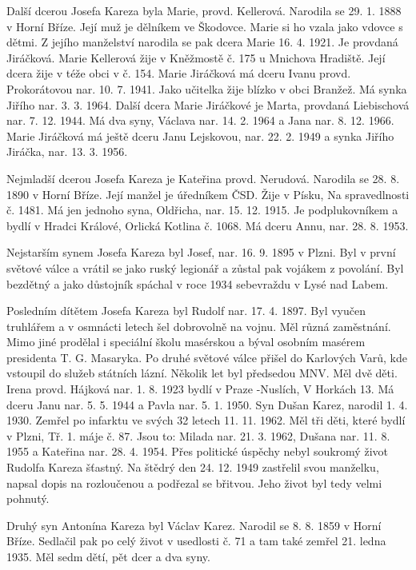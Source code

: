 \documentclass[../dejiny-rodu-prusiku.tex]{subfiles}
\begin{document}
Další dcerou Josefa Kareza byla Marie, provd. Kellerová. Narodila se 29. 1. 1888 v Horní Bříze. Její muž je dělní­kem ve Škodovce. Marie si ho vzala jako vdovce s dětmi. Z jejího manželství narodila se pak dcera Marie 16. 4. 1921. Je provdaná Jiráčková. Marie Kellerová žije v Kněžmostě č. 175 u Mnichova Hradiště. Její dcera žije v téže obci v č. 154. Marie Jiráčková má dceru Ivanu provd. Prokorátovou nar. 10. 7. 1941. Jako učitelka žije blízko v obci Branžež. Má synka Jiřího nar. 3. 3. 1964. Další dcera Marie Jiráčkové je Marta, provdaná Liebischová nar. 7. 12. 1944. Má dva syny, Václava nar. 14. 2. 1964 a Jana nar. 8. 12. 1966. Marie Jiráčková má ještě dceru Janu Lejskovou, nar. 22. 2. 1949 a synka Jiřího Jiráčka, nar. 13. 3. 1956.

Nejmladší dcerou Josefa Kareza je Kateřina provd. Nerudová. Narodila se 28. 8. 1890 v Horní Bříze. Její manžel je úředníkem ČSD. Žije v Písku, Na spravedlnosti č. 1481. Má jen jednoho syna, Oldřicha, nar. 15. 12. 1915. Je podplukovníkem a bydlí v Hradci Králové, Orlická Kotlina č. 1068. Má dceru Annu, nar. 28. 8. 1953.

Nejstarším synem Josefa Kareza byl Josef, nar. 16. 9. 1895 v Plzni. Byl v první světové válce a vrátil se jako ruský legionář a zůstal pak vojákem z povolání. Byl bez­dětný a jako důstojník spáchal v roce 1934 sebevraždu v Lysé nad Labem.

Posledním dítětem Josefa Kareza byl Rudolf nar. 17. 4. 1897. Byl vyučen truhlářem a v osmnácti letech šel dobrovolně na vojnu. Měl různá zaměstnání. Mimo jiné prodělal i spe­ciální školu masérskou a býval osobním masérem presiden­ta T. G. Masaryka. Po druhé světové válce přišel do Karlo­vých Varů, kde vstoupil do služeb státních lázní. Něko­lik let byl předsedou MNV. Měl dvě děti. Irena provd. Háj­ková nar. 1. 8. 1923 bydlí v Praze -Nuslích, V Horkách 13. Má dceru Janu nar. 5. 5. 1944 a Pavla nar. 5. 1. 1950. Syn Dušan Karez, narodil 1. 4. 1930. Zemřel po infarktu ve svých 32 letech 11. 11. 1962. Měl tři děti, které bydlí v Plzni, Tř. 1. máje č. 87. Jsou to: Milada nar. 21. 3. 1962, Dušana nar. 11. 8. 1955 a Kateřina nar. 28. 4. 1954. Přes politické úspěchy nebyl soukromý život Rudolfa Kareza šťastný. Na štědrý den 24. 12. 1949 zastřelil svou manželku, napsal dopis na rozloučenou a podřezal se břitvou. Jeho život byl tedy velmi pohnutý.

Druhý syn Antonína Kareza byl Václav Karez. Narodil se 8. 8. 1859 v Horní Bříze. Sedlačil pak po celý život v usedlosti č. 71 a tam také zemřel 21. ledna 1935. Měl sedm dětí, pět dcer a dva syny.
\end{document}
